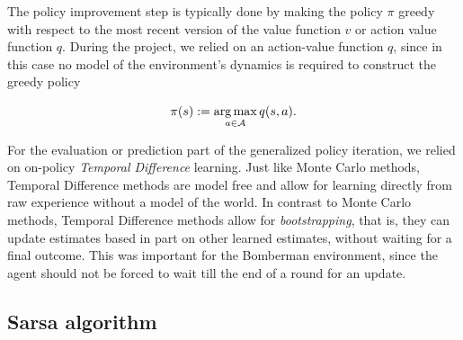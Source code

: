 The policy improvement step is typically done by making the policy $\pi$ greedy with respect to the most recent version of the value function $v$ or action value function $q$. During the project, we relied on an action-value function $q$, since in this case no model of the environment's dynamics is required to construct the greedy policy 

\begin{equation} \label{eq:greedy_policy_update}
	\pi(s) := \operatorname*{arg\,max}_{a \in \mathcal{A}} q(s, a).
\end{equation}

For the evaluation or prediction part of the generalized policy iteration, we relied on on-policy \emph{Temporal Difference} learning. Just like Monte Carlo methods, Temporal Difference methods are model free and allow for learning directly from raw experience without a model of the world. In contrast to Monte Carlo methods, Temporal Difference methods allow for \emph{bootstrapping}, that is, they can update estimates based in part on other learned estimates, without waiting for a final outcome. This was important for the Bomberman environment, since the agent should not be forced to wait till the end of a round for an update.

\subsection{Sarsa algorithm}

